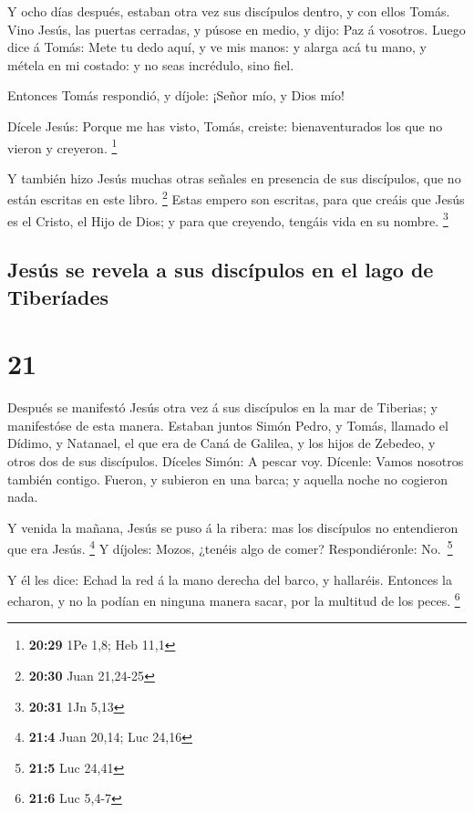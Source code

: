  Y ocho días después, estaban otra vez sus discípulos
dentro, y con ellos Tomás. Vino Jesús, las puertas cerradas, y púsose en
medio, y dijo: Paz á vosotros.  Luego dice á Tomás: Mete tu
dedo aquí, y ve mis manos: y alarga acá tu mano, y métela en mi costado:
y no seas incrédulo, sino fiel.

 Entonces Tomás respondió, y díjole: ¡Señor mío, y Dios
mío!

 Dícele Jesús: Porque me has visto, Tomás, creiste:
bienaventurados los que no vieron y creyeron. \footnote{\textbf{20:29}
  1Pe 1,8; Heb 11,1}

 Y también hizo Jesús muchas otras señales en presencia de
sus discípulos, que no están escritas en este libro. \footnote{\textbf{20:30}
  Juan 21,24-25}  Estas empero son escritas, para que
creáis que Jesús es el Cristo, el Hijo de Dios; y para que creyendo,
tengáis vida en su nombre. \footnote{\textbf{20:31} 1Jn 5,13}

\hypertarget{jesuxfas-se-revela-a-sus-discuxedpulos-en-el-lago-de-tiberuxedades}{%
\subsection{Jesús se revela a sus discípulos en el lago de
Tiberíades}\label{jesuxfas-se-revela-a-sus-discuxedpulos-en-el-lago-de-tiberuxedades}}

\hypertarget{section-20}{%
\section{21}\label{section-20}}

 Después se manifestó Jesús otra vez á sus discípulos en la
mar de Tiberias; y manifestóse de esta manera.  Estaban
juntos Simón Pedro, y Tomás, llamado el Dídimo, y Natanael, el que era
de Caná de Galilea, y los hijos de Zebedeo, y otros dos de sus
discípulos.  Díceles Simón: A pescar voy. Dícenle: Vamos
nosotros también contigo. Fueron, y subieron en una barca; y aquella
noche no cogieron nada.

 Y venida la mañana, Jesús se puso á la ribera: mas los
discípulos no entendieron que era Jesús. \footnote{\textbf{21:4} Juan
  20,14; Luc 24,16}  Y díjoles: Mozos, ¿tenéis algo de
comer? Respondiéronle: No.~\footnote{\textbf{21:5} Luc 24,41}

 Y él les dice: Echad la red á la mano derecha del barco, y
hallaréis. Entonces la echaron, y no la podían en ninguna manera sacar,
por la multitud de los peces. \footnote{\textbf{21:6} Luc 5,4-7}

